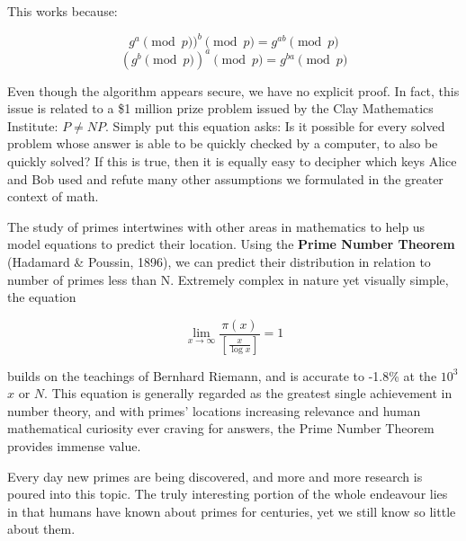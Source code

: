 This works because:

\[g^a \pmod{p})^b \pmod{p} = g^{ab} \pmod{p}\]
\[(g^b \pmod{p})^a \pmod{p} = g^{ba} \pmod{p}\]

Even though the algorithm appears secure, we have no explicit proof. In fact, this issue is related to a \$1 million prize problem issued by the Clay Mathematics Institute: \(P \neq NP\). Simply put this equation asks: Is it possible for every solved problem whose answer is able to be quickly checked by a computer, to also be quickly solved? If this is true, then it is equally easy to decipher which keys Alice and Bob used and refute many other assumptions we formulated in the greater context of math.

The study of primes intertwines with other areas in mathematics to help us model equations to predict their location. Using the \textbf{Prime Number Theorem} (Hadamard \& Poussin, 1896), we can predict their distribution in relation to number of primes less than N. Extremely complex in nature yet visually simple, the equation

\[
\lim_{x\to\infty} \frac{\pi(x)}{[\frac{x}{\log{x}}]} = 1    
\]

builds on the teachings of Bernhard Riemann, and is accurate to -1.8\% at the \(10^3\) \(x\) or \(N\). This equation is generally regarded as the greatest single achievement in number theory, and with primes’ locations increasing relevance and human mathematical curiosity ever craving for answers, the Prime Number Theorem provides immense value. 

Every day new primes are being discovered, and more and more research is poured into this topic. The truly interesting portion of the whole endeavour lies in that humans have known about primes for centuries, yet we still know so little about them. 
